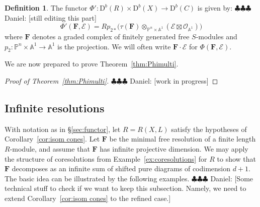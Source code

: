 \documentclass[12pt]{amsart}
\theoremstyle{definition}
\newtheorem{defn}[lemma]{Definition}
\theoremstyle{remark}
\newcommand{\PP}{\mathbb{P}}
\renewcommand{\AA}{\mathbb{A}}
\newcommand{\cO}{\mathcal{O}}
\newcommand{\cE}{\mathcal{E}}
\newcommand{\FF}{\mathbf{F}}
\newcommand{\DD}{\mathrm{D}}
\newcommand{\daniel}[1]{{\color{green} \sf $\clubsuit\clubsuit\clubsuit$ Daniel: [#1]}}
\renewcommand{\P}{{\mathbb P}}
\begin{document}

\begin{defn} \label{defn:product} The functor $\Phi': \DD^{b}(R)\times \DD^b(X) \to \DD^{b}(C)$ is given by:
\daniel{still editing this part}
$$
\Phi'(\FF,\cE) = Rp_{2*} \bigl(\tau(\FF)\otimes_{\P^{n}\times\AA^{1}} (\cE\boxtimes \cO_{\AA^{1}}) \bigr)
$$
where $\FF$ denotes a graded  complex of finitely generated free $S$-modules and
$p_2: \PP^{n}\times \AA^{1}\to \AA^{1}$ is the projection. We will often write
$\FF\cdot \cE$ for $\Phi(\FF,\cE)$.
\end{defn}

We are now prepared to prove Theorem~\ref{thm:Phimulti}.
\begin{proof}[Proof of Theorem~\ref{thm:Phimulti}]
\daniel{work in progress}
\end{proof}

\subsection{Infinite resolutions}\label{subsec:infinite}
With notation as in \S\ref{sec:functor}, let $R=R(X,L)$ satisfy the hypotheses of Corollary~\ref{cor:isom cones}.  Let $\FF$ be the minimal free resolution of a finite length $R$-module, and assume that $\FF$ has infinite projective dimension.  We may apply the structure of coresolutions from Example~\ref{ex:coresolutions} for $R$ to show that $\FF$ decomposes as an infinite sum of shifted pure diagrams of codimension $d+1$.  The basic idea can be illustrated by the following examples.\daniel{Some technical stuff to check if we want to keep this subsection.  Namely, we need to extend Corollary~\ref{cor:isom cones} to the refined case.}
\end{document}
